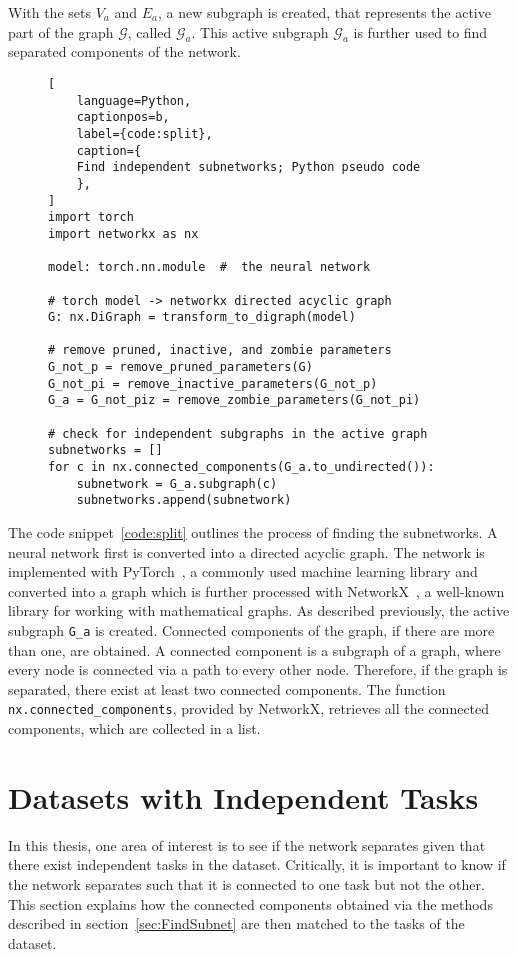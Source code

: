 With the sets $V_a$ and $E_a$, a new subgraph is created, that represents the active part of the graph $\mathcal{G}$, called $\mathcal{G}_a$.
This active subgraph $\mathcal{G}_a$ is further used to find separated components of the network.

\begin{figure}[ht] %
\centering
\begin{minipage}{\linewidth}
\begin{lstlisting}[
    language=Python,
    captionpos=b, 
    label={code:split},
    caption={
    Find independent subnetworks; Python pseudo code
    },
]
import torch
import networkx as nx

model: torch.nn.module  #  the neural network

# torch model -> networkx directed acyclic graph
G: nx.DiGraph = transform_to_digraph(model)

# remove pruned, inactive, and zombie parameters
G_not_p = remove_pruned_parameters(G)
G_not_pi = remove_inactive_parameters(G_not_p)
G_a = G_not_piz = remove_zombie_parameters(G_not_pi)

# check for independent subgraphs in the active graph
subnetworks = []
for c in nx.connected_components(G_a.to_undirected()):
    subnetwork = G_a.subgraph(c)
    subnetworks.append(subnetwork)
\end{lstlisting}
\end{minipage}
\end{figure}

The code snippet~\ref{code:split} outlines the process of finding the subnetworks.
A neural network first is converted into a directed acyclic graph.
The network is implemented with PyTorch~\autocite{pytorch}, a commonly used machine learning library and converted into a graph which is further processed with NetworkX~\autocite{networkx}, a well-known library for working with mathematical graphs.
As described previously, the active subgraph \lstinline{G_a} is created.
Connected components of the graph, if there are more than one, are obtained.
A connected component is a subgraph of a graph, where every node is connected via a path to every other node.
Therefore, if the graph is separated, there exist at least two connected components.
The function \lstinline{nx.connected_components}, provided by NetworkX, retrieves all the connected components, which are collected in a list.

\section{Datasets with Independent Tasks}\label{sec:taskmatch}
In this thesis, one area of interest is to see if the network separates given that there exist independent tasks in the dataset.
Critically, it is important to know if the network separates such that it is connected to one task but not the other.
This section explains how the connected components obtained via the methods described in section~\ref{sec:FindSubnet} are then matched to the tasks of the dataset.

